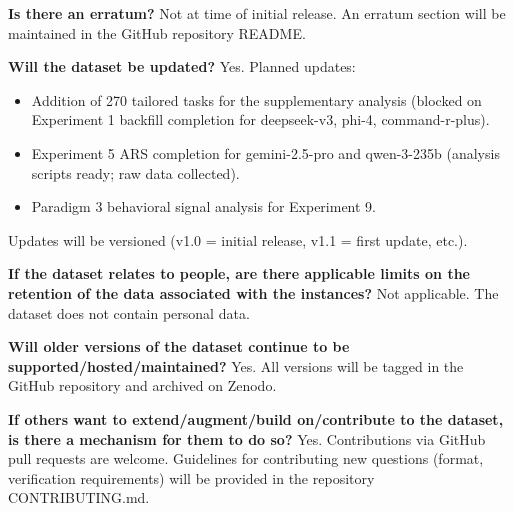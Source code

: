 \textbf{Is there an erratum?}
Not at time of initial release. An erratum section will be maintained in the
GitHub repository README.

\textbf{Will the dataset be updated?}
Yes. Planned updates:
\begin{itemize}
  \item Addition of 270 tailored tasks for the supplementary analysis (blocked on
    Experiment 1 backfill completion for deepseek-v3, phi-4, command-r-plus).
  \item Experiment 5 ARS completion for gemini-2.5-pro and qwen-3-235b
    (analysis scripts ready; raw data collected).
  \item Paradigm 3 behavioral signal analysis for Experiment 9.
\end{itemize}
Updates will be versioned (v1.0 = initial release, v1.1 = first update, etc.).

\textbf{If the dataset relates to people, are there applicable limits on the
retention of the data associated with the instances?}
Not applicable. The dataset does not contain personal data.

\textbf{Will older versions of the dataset continue to be supported/hosted/maintained?}
Yes. All versions will be tagged in the GitHub repository and archived on Zenodo.

\textbf{If others want to extend/augment/build on/contribute to the dataset, is
there a mechanism for them to do so?}
Yes. Contributions via GitHub pull requests are welcome. Guidelines for contributing
new questions (format, verification requirements) will be provided in the repository
CONTRIBUTING.md.
